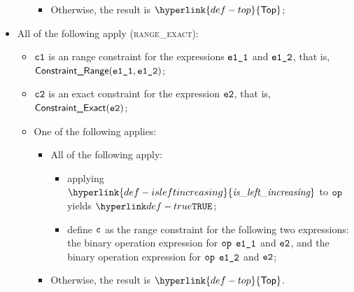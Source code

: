 \documentclass{book}
\newcommand\isleftincreasing[0]{\hyperlink{def-isleftincreasing}{\textfunc{is\_left\_increasing}}}
\newcommand\Top[0]{\hyperlink{def-top}{\textsf{Top}}}
\begin{document}
\begin{itemize}
\begin{itemize}
\begin{itemize}
      \item Otherwise, the result is $\Top$;
    \end{itemize}
  \end{itemize}

  \item All of the following apply (\textsc{range\_exact}):
  \begin{itemize}
    \item $\texttt{c1}$ is an range constraint for the expressions $\texttt{e1\_1}$ and $\texttt{e1\_2}$, that is, \\ $\textsf{Constraint\_Range}(\texttt{e1\_1}, \texttt{e1\_2})$;
    \item $\texttt{c2}$ is an exact constraint for the expression $\texttt{e2}$, that is, $\textsf{Constraint\_Exact}(\texttt{e2})$;
    \item One of the following applies:
    \begin{itemize}
      \item All of the following apply:
      \begin{itemize}
        \item applying $\isleftincreasing$ to $\texttt{op}$ yields $\True$;
        \item define $\texttt{c}$ as the range constraint for the following two expressions:
              the binary operation expression for $\texttt{op}$ $\texttt{e1\_1}$ and $\texttt{e2}$, and
              the binary operation expression for $\texttt{op}$ $\texttt{e1\_2}$ and $\texttt{e2}$;
      \end{itemize}
      \item Otherwise, the result is $\Top$.
    \end{itemize}
  \end{itemize}


\end{itemize}
\end{document}
